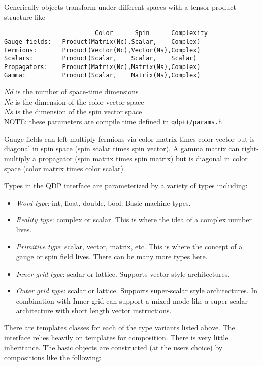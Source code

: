 \documentclass[12pt,letterpaper]{article}
\begin{document}
Generically objects transform under different spaces with a tensor
product structure like

\begin{verbatim}
                         Color      Spin      Complexity
Gauge fields:   Product(Matrix(Nc),Scalar,    Complex)
Fermions:       Product(Vector(Nc),Vector(Ns),Complex)
Scalars:        Product(Scalar,    Scalar,    Scalar)
Propagators:    Product(Matrix(Nc),Matrix(Ns),Complex)
Gamma:          Product(Scalar,    Matrix(Ns),Complex)
\end{verbatim}

\noindent
$Nd$ is the number of space-time dimensions\\
\noindent
$Nc$ is the dimension of the color vector space\\
\noindent
$Ns$ is the dimension of the spin vector space\\
\noindent
NOTE: these parameters are compile time defined in  {\tt qdp++/params.h}

Gauge fields can left-multiply fermions via color matrix times color
vector but is diagonal in spin space (spin scalar times spin vector).
A gamma matrix can right-multiply a propagator (spin matrix times
spin matrix) but is diagonal in color space (color matrix times color
scalar).

Types in the QDP interface are parameterized by a variety of types including:
\begin{itemize}
\item {\em Word type}: 
  int, float, double, bool. Basic machine types.
\item {\em Reality type}: 
  complex or scalar. This is where the idea of a complex number
  lives.
\item {\em Primitive type}: 
  scalar, vector, matrix, etc. This is where the concept of a gauge or
  spin field lives. There can be many more types here.
\item {\em Inner grid type}: 
  scalar or lattice. Supports vector style architectures.
\item {\em Outer grid type}:
  scalar or lattice. Supports super-scalar style architectures. In
  combination with Inner grid can support a mixed mode like a
  super-scalar architecture with short length vector instructions.
\end{itemize}

There are templates classes for each of the type variants listed
above. The interface relies heavily on templates for
composition. There is very little inheritance. The basic objects are
constructed (at the users choice) by compositions like the following:
\end{document}

